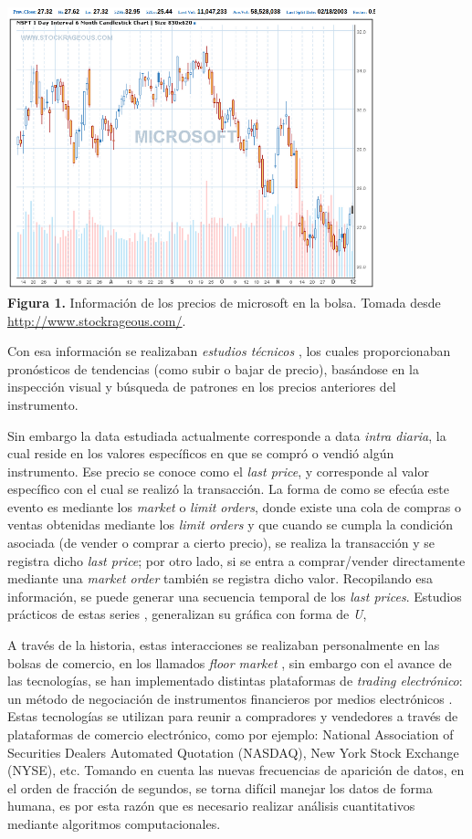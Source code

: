 \begin{center}
	\includegraphics[width=0.8\textwidth]{images/microsoft} \\
	\textbf{Figura 1.} Información de los precios de microsoft en la bolsa.
Tomada desde \url{http://www.stockrageous.com/}.
\end{center}

Con esa información se realizaban \emph{estudios técnicos}
\cite{taylor1992use}, los cuales proporcionaban pronósticos de tendencias (como
subir o bajar de precio), basándose en la inspección visual y búsqueda de
patrones en los precios anteriores del instrumento. 

Sin embargo la data estudiada actualmente corresponde a data \emph{intra
diaria}, la cual reside en los valores específicos en que se compró o vendió
algún instrumento.  Ese precio se conoce como el \emph{last price}, y
corresponde al valor específico con el cual se realizó la transacción. La forma
de como se efecúa este evento es mediante los \emph{market} o \emph{limit
orders}, donde existe una cola de compras o ventas obtenidas mediante los
\emph{limit orders} y que cuando se cumpla la condición asociada (de vender o
comprar a cierto precio), se realiza la transacción y se registra dicho
\emph{last price}; por otro lado, si se entra a comprar/vender directamente
mediante una \emph{market order} también se registra dicho valor. Recopilando
esa información, se puede generar una secuencia temporal de los \emph{last
prices}. Estudios prácticos de estas series \cite{biais2012empirical},
generalizan su gráfica con forma de \emph{U},

A través de la historia, estas interacciones se realizaban personalmente en las
bolsas de comercio, en los llamados \emph{floor market}
\cite{jain2005financial}, sin embargo con el avance de las tecnologías, se han
implementado distintas plataformas de \emph{trading electrónico}: un método de
negociación de instrumentos financieros por medios electrónicos
\cite{weston2002electronic}. Estas tecnologías se utilizan para reunir a
compradores y vendedores a través de plataformas de comercio electrónico, como
por ejemplo: National Association of Securities Dealers Automated Quotation
(NASDAQ), New York Stock Exchange (NYSE), etc. Tomando en cuenta las nuevas
frecuencias de aparición de datos, en el orden de fracción de segundos, se
torna difícil manejar los datos de forma humana, es por esta razón que es
necesario realizar análisis cuantitativos mediante algoritmos computacionales.

